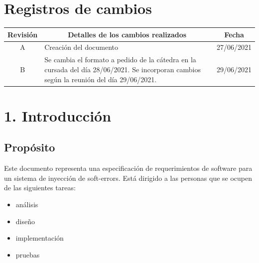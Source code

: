 \documentclass[
11pt, %
codirector, %
]{charter}
\begin{document}
\maketitle
\thispagestyle{empty}
\pagebreak


\thispagestyle{empty}
{\setlength{\parskip}{0pt}
\tableofcontents{}
}
\pagebreak


\section*{Registros de cambios}
\label{sec:registro}

\begin{table}[ht]
\label{tab:registro}
\centering
\begin{tabularx}{\linewidth}{@{}|c|X|c|@{}}
\hline
\rowcolor[HTML]{C0C0C0} 
Revisión & \multicolumn{1}{c|}{\cellcolor[HTML]{C0C0C0}Detalles de los cambios realizados} & Fecha      \\ \hline
A & Creación del documento & 27/06/2021 \\ \hline
B & Se cambia el formato a pedido de la cátedra en la cursada del día 28/06/2021. \newline
	Se incorporan cambios según la reunión del día 29/06/2021. & 29/06/2021 \\ \hline
\end{tabularx}
\end{table}

\pagebreak

\section{1. Introducción}
\label{sec:introduccion}

\subsection{Propósito}

Este documento representa una especificación de requerimientos de software para un sistema de inyección de soft-errors. Está dirigido a las personas que se ocupen de las siguientes tareas:
\begin{itemize}
	\item análisis
	\item diseño
	\item implementación
	\item pruebas
\end{itemize}
\end{document}
